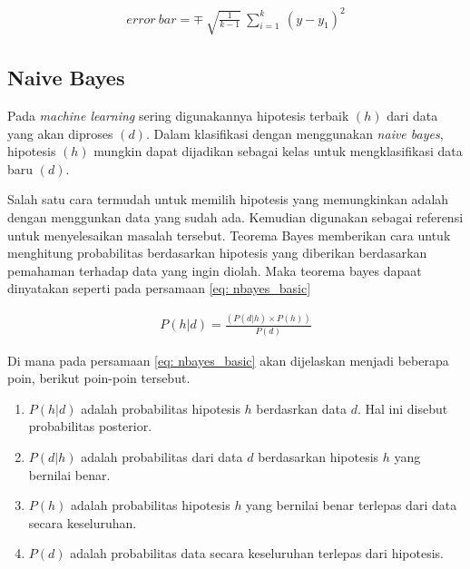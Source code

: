 \begin{subs}
\begin{enumerate}[label=\textbf{\alph*).}]
		\begin{equation}\label{eq: KNN_distance_weigh_std_dev}
		\begin{split}
		error\ bar = \mp\ \sqrt{\frac{1}{k - 1}}\ \sum_{i = 1}^{k}\ (y - y_{1})^2
		\end{split}
		\end{equation}
		
	\end{enumerate}
	
	\subsection{Naive Bayes}
	\label{sec:sub_sec2_bayes}
	\vspace{1ex}
	
	Pada \textit{machine learning} sering digunakannya hipotesis terbaik $(h)$ dari data yang akan diproses $(d)$. Dalam klasifikasi dengan menggunakan \textit{naive bayes}, hipotesis $(h)$ mungkin dapat dijadikan sebagai kelas untuk mengklasifikasi data baru $(d)$.
	\vspace{1ex}
	
	Salah satu cara termudah untuk memilih hipotesis yang memungkinkan adalah dengan menggunkan data yang sudah ada. Kemudian digunakan sebagai referensi untuk menyelesaikan masalah tersebut. Teorema Bayes memberikan cara untuk menghitung probabilitas berdasarkan hipotesis yang diberikan berdasarkan pemahaman terhadap data yang ingin diolah. Maka teorema bayes dapaat dinyatakan seperti pada persamaan \ref{eq: nbayes_basic}
	
	\begin{equation}\label{eq: nbayes_basic}
	\begin{split}
	P(h|d) = \frac{(P(d|h) \times P(h))}{P(d)}
	\end{split}
	\end{equation}
	
	Di mana pada persamaan \ref{eq: nbayes_basic} akan dijelaskan menjadi beberapa poin, berikut poin-poin tersebut.
	
	\begin{enumerate}
		\item $P(h|d)$ adalah probabilitas hipotesis $h$ berdasrkan data $d$. Hal ini disebut probabilitas posterior.
		\item $P(d|h)$ adalah probabilitas dari data $d$ berdasarkan hipotesis $h$ yang bernilai benar.
		\item $P(h)$ adalah probabilitas hipotesis $h$ yang bernilai benar terlepas dari data secara keseluruhan.
		\item $P(d)$ adalah probabilitas data secara keseluruhan terlepas dari hipotesis.
	\end{enumerate}
	

\end{subs}
